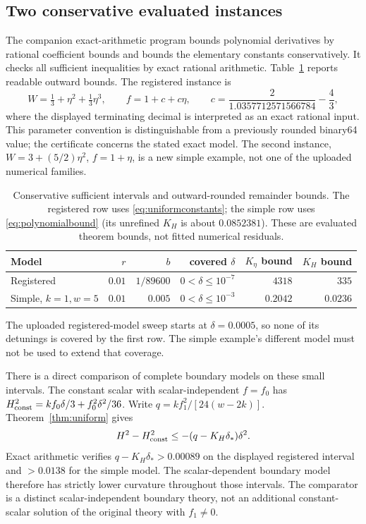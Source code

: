 \documentclass[11pt]{article}
\begin{document}
\subsection{Two conservative evaluated instances}
The companion exact-arithmetic program bounds polynomial derivatives by rational coefficient bounds and bounds the elementary constants conservatively. It checks all sufficient inequalities by exact rational arithmetic. Table~\ref{tab:certified} reports readable outward bounds. The registered instance is
\begin{equation}
W=\tfrac13+\eta^2+\tfrac13\eta^3,\qquad f=1+c+c\eta,\qquad
c=\frac{2}{1.0357712571566784}-\frac43,
\end{equation}
where the displayed terminating decimal is interpreted as an exact rational input. This parameter convention is distinguishable from a previously rounded binary64 value; the certificate concerns the stated exact model. The second instance, $W=3+(5/2)\eta^2$, $f=1+\eta$, is a new simple example, not one of the uploaded numerical families.
\begin{table}[ht]
\centering\small
\begin{tabular}{lrrrrr}\toprule
Model & $r$ & $b$ & covered $\delta$ & $K_\eta$ bound & $K_H$ bound\\\midrule
Registered & $0.01$ & $1/89600$ & $0<\delta\le10^{-7}$ & $4318$ & $335$\\
Simple, $k=1,w=5$ & $0.01$ & $0.005$ & $0<\delta\le10^{-3}$ & $0.2042$ & $0.0236$\\\bottomrule
\end{tabular}
\caption{Conservative sufficient intervals and outward-rounded remainder bounds. The registered row uses \eqref{eq:uniformconstants}; the simple row uses \eqref{eq:polynomialbound} (its unrefined $K_H$ is about $0.0852381$). These are evaluated theorem bounds, not fitted numerical residuals.}\label{tab:certified}
\end{table}
The uploaded registered-model sweep starts at $\delta=0.0005$, so none of its detunings is covered by the first row. The simple example's different model must not be used to extend that coverage.

There is a direct comparison of complete boundary models on these small intervals. The constant scalar with scalar-independent $f=f_0$ has
$H_{\rm const}^2=kf_0\delta/3+f_0^2\delta^2/36$. Write $q=kf_1^2/[24(w-2k)]$. Theorem~\ref{thm:uniform} gives
\begin{equation}
H^2-H_{\rm const}^2\le-(q-K_H\delta_*)\delta^2.
\end{equation}
Exact arithmetic verifies $q-K_H\delta_*>0.00089$ on the displayed registered interval and $>0.0138$ for the simple model. The scalar-dependent boundary model therefore has strictly lower curvature throughout those intervals. The comparator is a distinct scalar-independent boundary theory, not an additional constant-scalar solution of the original theory with $f_1\ne0$.
\end{document}
